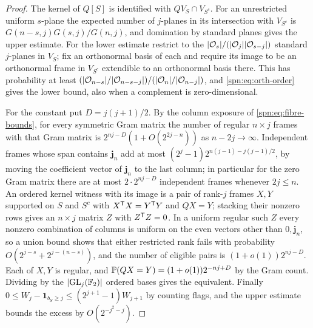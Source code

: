 \begin{proof}
The kernel of $Q[S]$ is identified with $QV_S\cap V_{S^c}$. For an unrestricted uniform
$s$-plane the expected number of $j$-planes in its intersection with $V_{S^c}$ is
$G(n-s,j)G(s,j)/G(n,j)$, and domination by standard planes gives the upper estimate. For the
lower estimate restrict to the $\lvert\mathcal{O}_s\rvert/(\lvert\mathcal{O}_j\rvert\lvert\mathcal{O}_{s-j}\rvert)$ standard
$j$-planes in $V_S$; fix an orthonormal basis of each and require its image to be an orthonormal
frame in $V_{S^c}$ extendible to an orthonormal basis there. This has probability at least
$(\lvert\mathcal{O}_{n-s}\rvert/\lvert\mathcal{O}_{n-s-j}\rvert)/(\lvert\mathcal{O}_n\rvert/\lvert\mathcal{O}_{n-j}\rvert)$, and
\eqref{spn:eq:orth-order} gives the lower bound, also when a complement is zero-dimensional.

For the constant put $D=j(j+1)/2$. By the column exposure of \eqref{spn:eq:fibre-bounds}, for
every symmetric Gram matrix the number of regular $n\times j$ frames with that Gram matrix is
$2^{nj-D}(1+O(2^{2j-n}))$ as $n-2j\to\infty$. Independent frames whose span contains
$\mathbf j_n$ add at most $(2^j-1)2^{n(j-1)-j(j-1)/2}$, by moving the coefficient vector of
$\mathbf j_n$ to the last column; in particular for the zero Gram matrix there are at most
$2\cdot2^{nj-D}$ independent frames whenever $2j\le n$. An ordered kernel witness with its image
is a pair of rank-$j$ frames $X,Y$ supported on $S$ and $S^c$ with $X^{\mathsf{T}}X=Y^{\mathsf{T}}Y$ and
$QX=Y$; stacking their nonzero rows gives an $n\times j$ matrix $Z$ with $Z^{\mathsf{T}}Z=0$. In a
uniform regular such $Z$ every nonzero combination of columns is uniform on the even vectors
other than $0,\mathbf j_n$, so a union bound shows that either restricted rank fails with
probability $O(2^{j-s}+2^{j-(n-s)})$, and the number of eligible pairs is $(1+o(1))2^{nj-D}$. Each
of $X,Y$ is regular, and $\mathbb{P}(QX=Y)=(1+o(1))2^{-nj+D}$ by the Gram count. Dividing by the
$\lvert\operatorname{GL}_j(\mathbb{F}_2)\rvert$ ordered bases gives the equivalent. Finally
$0\le W_j-\mathbf 1_{b_S\ge j}\le(2^{j+1}-1)W_{j+1}$ by counting flags, and the upper estimate
bounds the excess by $O(2^{-j^2-j})$.
\end{proof}

